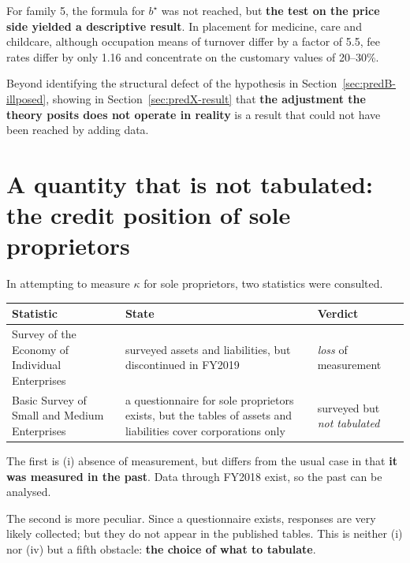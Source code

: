 For family 5, the formula for $b^\star$ was not reached, but \textbf{the test on the price side
yielded a descriptive result}. In placement for medicine, care and childcare, although occupation
means of turnover differ by a factor of 5.5, fee rates differ by only 1.16 and concentrate on the
customary values of 20--30\%.

Beyond identifying the structural defect of the hypothesis in
Section~\ref{sec:predB-illposed}, showing in Section~\ref{sec:predX-result} that \textbf{the
adjustment the theory posits does not operate in reality} is a result that could not have been
reached by adding data.


\section{A quantity that is not tabulated: the credit position of sole proprietors}
\label{sec:not-tabulated}

In attempting to measure $\kappa$ for sole proprietors, two statistics were consulted.

\begin{center}
\begin{tabularx}{\textwidth}{@{}lXl@{}}
\toprule
Statistic & State & Verdict \\
\midrule
Survey of the Economy of Individual Enterprises & surveyed assets and liabilities, but discontinued in FY2019 & \emph{loss} of measurement \\
Basic Survey of Small and Medium Enterprises & a questionnaire for sole proprietors exists, but the tables of assets and liabilities cover corporations only & surveyed but \emph{not tabulated} \\
\bottomrule
\end{tabularx}
\label{tab:individual-kappa-stats}
\end{center}

The first is (i) absence of measurement, but differs from the usual case in that \textbf{it was
measured in the past}. Data through FY2018 exist, so the past can be analysed.

The second is more peculiar. Since a questionnaire exists, responses are very likely collected;
but they do not appear in the published tables. This is neither (i) nor (iv) but a fifth
obstacle: \textbf{the choice of what to tabulate}.

